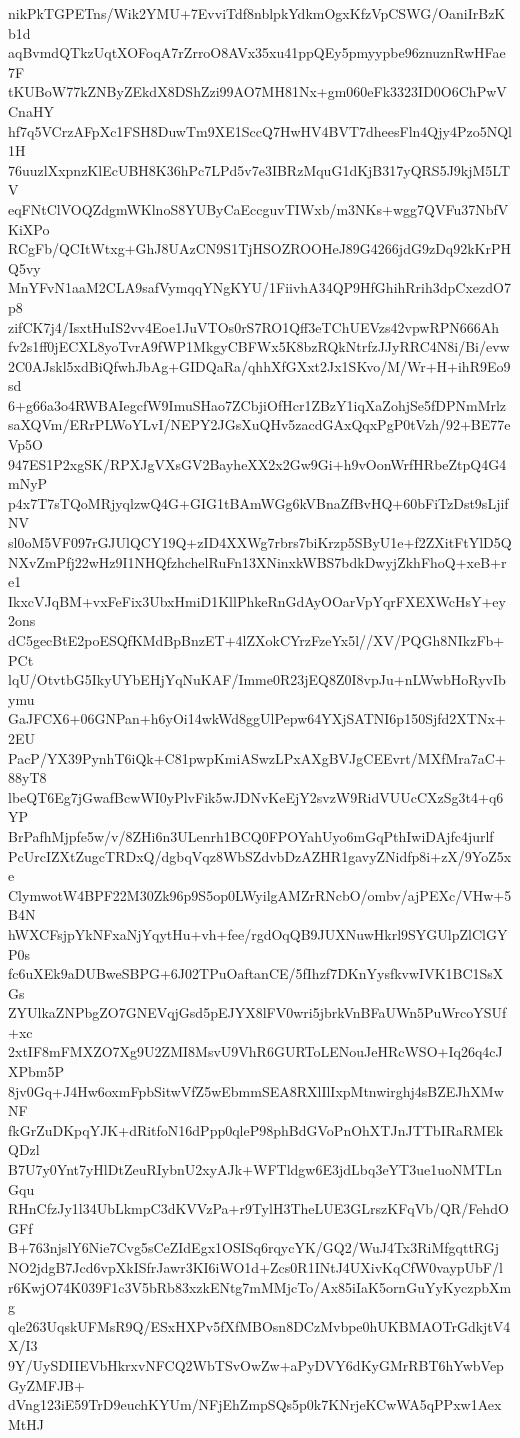 nikPkTGPETns/Wik2YMU+7EvviTdf8nblpkYdkmOgxKfzVpCSWG/OaniIrBzKb1d
aqBvmdQTkzUqtXOFoqA7rZrroO8AVx35xu41ppQEy5pmyypbe96znuznRwHFae7F
tKUBoW77kZNByZEkdX8DShZzi99AO7MH81Nx+gm060eFk3323ID0O6ChPwVCnaHY
hf7q5VCrzAFpXc1FSH8DuwTm9XE1SccQ7HwHV4BVT7dheesFln4Qjy4Pzo5NQl1H
76uuzlXxpnzKlEcUBH8K36hPc7LPd5v7e3IBRzMquG1dKjB317yQRS5J9kjM5LTV
eqFNtClVOQZdgmWKlnoS8YUByCaEccguvTIWxb/m3NKs+wgg7QVFu37NbfVKiXPo
RCgFb/QCItWtxg+GhJ8UAzCN9S1TjHSOZROOHeJ89G4266jdG9zDq92kKrPHQ5vy
MnYFvN1aaM2CLA9safVymqqYNgKYU/1FiivhA34QP9HfGhihRrih3dpCxezdO7p8
zifCK7j4/IsxtHuIS2vv4Eoe1JuVTOs0rS7RO1Qff3eTChUEVzs42vpwRPN666Ah
fv2s1ff0jECXL8yoTvrA9fWP1MkgyCBFWx5K8bzRQkNtrfzJJyRRC4N8i/Bi/evw
2C0AJskl5xdBiQfwhJbAg+GIDQaRa/qhhXfGXxt2Jx1SKvo/M/Wr+H+ihR9Eo9sd
6+g66a3o4RWBAIegcfW9ImuSHao7ZCbjiOfHcr1ZBzY1iqXaZohjSe5fDPNmMrlz
saXQVm/ERrPLWoYLvI/NEPY2JGsXuQHv5zacdGAxQqxPgP0tVzh/92+BE77eVp5O
947ES1P2xgSK/RPXJgVXsGV2BayheXX2x2Gw9Gi+h9vOonWrfHRbeZtpQ4G4mNyP
p4x7T7sTQoMRjyqlzwQ4G+GIG1tBAmWGg6kVBnaZfBvHQ+60bFiTzDst9sLjifNV
sl0oM5VF097rGJUlQCY19Q+zID4XXWg7rbrs7biKrzp5SByU1e+f2ZXitFtYlD5Q
NXvZmPfj22wHz9I1NHQfzhchelRuFn13XNinxkWBS7bdkDwyjZkhFhoQ+xeB+re1
IkxcVJqBM+vxFeFix3UbxHmiD1KllPhkeRnGdAyOOarVpYqrFXEXWcHsY+ey2ons
dC5gecBtE2poESQfKMdBpBnzET+4lZXokCYrzFzeYx5l//XV/PQGh8NIkzFb+PCt
lqU/OtvtbG5IkyUYbEHjYqNuKAF/Imme0R23jEQ8Z0I8vpJu+nLWwbHoRyvIbymu
GaJFCX6+06GNPan+h6yOi14wkWd8ggUlPepw64YXjSATNI6p150Sjfd2XTNx+2EU
PacP/YX39PynhT6iQk+C81pwpKmiASwzLPxAXgBVJgCEEvrt/MXfMra7aC+88yT8
lbeQT6Eg7jGwafBcwWI0yPlvFik5wJDNvKeEjY2svzW9RidVUUcCXzSg3t4+q6YP
BrPafhMjpfe5w/v/8ZHi6n3ULenrh1BCQ0FPOYahUyo6mGqPthIwiDAjfc4jurlf
PcUrcIZXtZugcTRDxQ/dgbqVqz8WbSZdvbDzAZHR1gavyZNidfp8i+zX/9YoZ5xe
ClymwotW4BPF22M30Zk96p9S5op0LWyilgAMZrRNcbO/ombv/ajPEXc/VHw+5B4N
hWXCFsjpYkNFxaNjYqytHu+vh+fee/rgdOqQB9JUXNuwHkrl9SYGUlpZlClGYP0s
fc6uXEk9aDUBweSBPG+6J02TPuOaftanCE/5fIhzf7DKnYysfkvwIVK1BC1SsXGs
ZYUlkaZNPbgZO7GNEVqjGsd5pEJYX8lFV0wri5jbrkVnBFaUWn5PuWrcoYSUf+xc
2xtIF8mFMXZO7Xg9U2ZMI8MsvU9VhR6GURToLENouJeHRcWSO+Iq26q4cJXPbm5P
8jv0Gq+J4Hw6oxmFpbSitwVfZ5wEbmmSEA8RXlIlIxpMtnwirghj4sBZEJhXMwNF
fkGrZuDKpqYJK+dRitfoN16dPpp0qleP98phBdGVoPnOhXTJnJTTbIRaRMEkQDzl
B7U7y0Ynt7yHlDtZeuRIybnU2xyAJk+WFTldgw6E3jdLbq3eYT3ue1uoNMTLnGqu
RHnCfzJy1l34UbLkmpC3dKVVzPa+r9TylH3TheLUE3GLrszKFqVb/QR/FehdOGFf
B+763njslY6Nie7Cvg5sCeZIdEgx1OSISq6rqycYK/GQ2/WuJ4Tx3RiMfgqttRGj
NO2jdgB7Jcd6vpXkISfrJawr3KI6iWO1d+Zcs0R1INtJ4UXivKqCfW0vaypUbF/l
r6KwjO74K039F1c3V5bRb83xzkENtg7mMMjcTo/Ax85iIaK5ornGuYyKyczpbXmg
qle263UqskUFMsR9Q/ESxHXPv5fXfMBOsn8DCzMvbpe0hUKBMAOTrGdkjtV4X/I3
9Y/UySDIIEVbHkrxvNFCQ2WbTSvOwZw+aPyDVY6dKyGMrRBT6hYwbVepGyZMFJB+
dVng123iE59TrD9euchKYUm/NFjEhZmpSQs5p0k7KNrjeKCwWA5qPPxw1AexMtHJ
